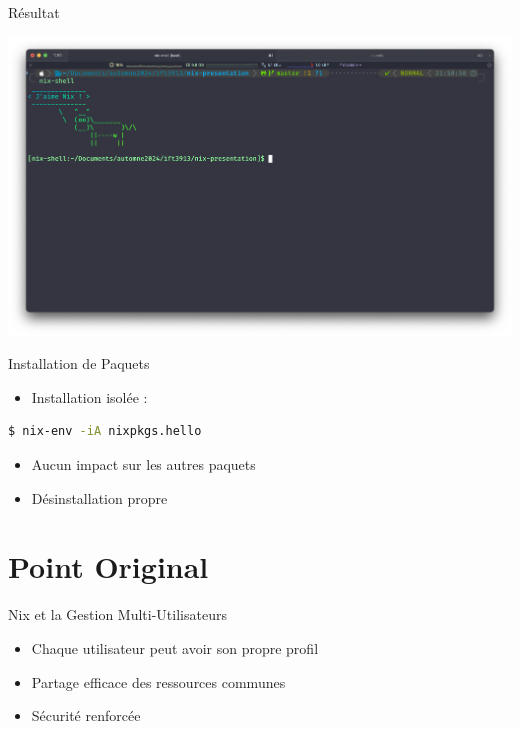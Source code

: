 \documentclass{beamer}
\begin{document}
\begin{frame}{Résultat}
  \begin{center}
    \includegraphics[width=\linewidth]{sg.png}
  \end{center}
\end{frame}




\begin{frame}[fragile]{Installation de Paquets}
	\begin{itemize}
		\item Installation isolée :
	\end{itemize}
	\begin{lstlisting}[language=bash]
$ nix-env -iA nixpkgs.hello
    \end{lstlisting}
	\begin{itemize}
		\item Aucun impact sur les autres paquets
		\item Désinstallation propre
	\end{itemize}
\end{frame}

\section{Point Original}

\begin{frame}{Nix et la Gestion Multi-Utilisateurs}
	\begin{itemize}
		\item Chaque utilisateur peut avoir son propre profil
		\item Partage efficace des ressources communes
		\item Sécurité renforcée
	\end{itemize}
\end{frame}
\end{document}

